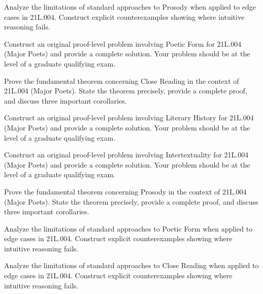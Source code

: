 \documentclass[12pt,a4paper]{exam}
\begin{document}
\begin{questions}

\question[5]
Analyze the limitations of standard approaches to Prosody when applied to edge cases in 21L.004. Construct explicit counterexamples showing where intuitive reasoning fails.

\vspace{0.3cm}

\question[5]
Construct an original proof-level problem involving Poetic Form for 21L.004 (Major Poets) and provide a complete solution. Your problem should be at the level of a graduate qualifying exam.

\vspace{0.3cm}

\question[7]
Prove the fundamental theorem concerning Close Reading in the context of 21L.004 (Major Poets). State the theorem precisely, provide a complete proof, and discuss three important corollaries.

\vspace{0.3cm}

\question[3]
Construct an original proof-level problem involving Literary History for 21L.004 (Major Poets) and provide a complete solution. Your problem should be at the level of a graduate qualifying exam.

\vspace{0.3cm}

\question[2]
Construct an original proof-level problem involving Intertextuality for 21L.004 (Major Poets) and provide a complete solution. Your problem should be at the level of a graduate qualifying exam.

\vspace{0.3cm}

\question[2]
Prove the fundamental theorem concerning Prosody in the context of 21L.004 (Major Poets). State the theorem precisely, provide a complete proof, and discuss three important corollaries.

\vspace{0.3cm}

\question[5]
Analyze the limitations of standard approaches to Poetic Form when applied to edge cases in 21L.004. Construct explicit counterexamples showing where intuitive reasoning fails.

\vspace{0.3cm}

\question[3]
Analyze the limitations of standard approaches to Close Reading when applied to edge cases in 21L.004. Construct explicit counterexamples showing where intuitive reasoning fails.


\end{questions}
\end{document}
